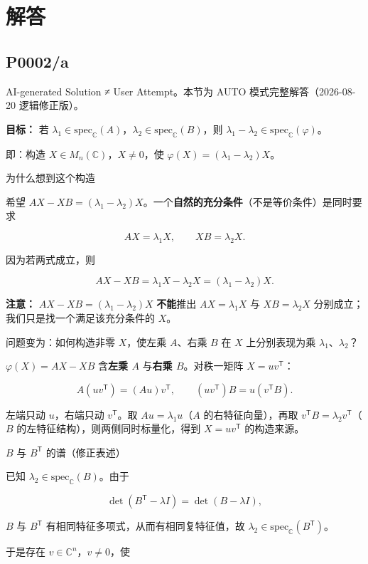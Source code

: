 \documentclass[
    lang=cn,
    color=blue,
    mode=fancy,
    thmcnt=section,
    scheme=chinese
]{elegantbook}
\begin{document}
\section{解答}
\subsection{P0002/a}
AI-generated Solution ≠ User Attempt。本节为 AUTO 模式完整解答（2026-08-20 逻辑修正版）。

\textbf{目标：} 若 $\lambda_1\in\mathrm{spec}_{\mathbb{C}}(A)$，$\lambda_2\in\mathrm{spec}_{\mathbb{C}}(B)$，则 $\lambda_1-\lambda_2\in\mathrm{spec}_{\mathbb{C}}(\varphi)$。

即：构造 $X\in M_n(\mathbb{C})$，$X\neq 0$，使 $\varphi(X)=(\lambda_1-\lambda_2)X$。

为什么想到这个构造

希望 $AX-XB=(\lambda_1-\lambda_2)X$。一个\textbf{自然的充分条件}（不是等价条件）是同时要求

\[
AX=\lambda_1 X,\qquad XB=\lambda_2 X.
\]

因为若两式成立，则

\[
AX-XB=\lambda_1 X-\lambda_2 X=(\lambda_1-\lambda_2)X.
\]

\textbf{注意：} $AX-XB=(\lambda_1-\lambda_2)X$ \textbf{不能}推出 $AX=\lambda_1 X$ 与 $XB=\lambda_2 X$ 分别成立；我们只是找一个满足该充分条件的 $X$。

问题变为：如何构造非零 $X$，使左乘 $A$、右乘 $B$ 在 $X$ 上分别表现为乘 $\lambda_1$、$\lambda_2$？

$\varphi(X)=AX-XB$ 含\textbf{左乘 $A$} 与\textbf{右乘 $B$}。对秩一矩阵 $X=uv^{\mathsf T}$：

\[
A(uv^{\mathsf T})=(Au)v^{\mathsf T},\qquad (uv^{\mathsf T})B=u(v^{\mathsf T}B).
\]

左端只动 $u$，右端只动 $v^{\mathsf T}$。取 $Au=\lambda_1 u$（$A$ 的右特征向量），再取 $v^{\mathsf T}B=\lambda_2 v^{\mathsf T}$（$B$ 的左特征结构），则两侧同时标量化，得到 $X=uv^{\mathsf T}$ 的构造来源。

$B$ 与 $B^{\mathsf T}$ 的谱（修正表述）

已知 $\lambda_2\in\mathrm{spec}_{\mathbb{C}}(B)$。由于

\[
\det(B^{\mathsf T}-\lambda I)=\det(B-\lambda I),
\]

$B$ 与 $B^{\mathsf T}$ 有相同特征多项式，从而有相同复特征值，故 $\lambda_2\in\mathrm{spec}_{\mathbb{C}}(B^{\mathsf T})$。

于是存在 $v\in\mathbb{C}^n$，$v\neq 0$，使
\end{document}
